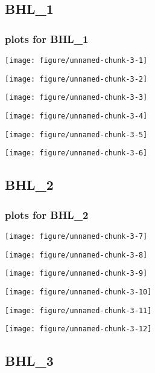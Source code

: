 \documentclass[10pt,a4paper]{article}\usepackage[]{graphicx}\usepackage[]{color}
\makeatletter
\def\maxwidth{ %
  \ifdim\Gin@nat@width>\linewidth
    \linewidth
  \else
    \Gin@nat@width
  \fi
}
\newcommand{\AaA}{\_}
\makeatother
\begin{document}
\subsection{BHL\AaA 1}
\subsubsection{plots for BHL\AaA 1}

\texttt{[image: figure/unnamed-chunk-3-1]} 

\newpage

\texttt{[image: figure/unnamed-chunk-3-2]} 

\newpage

\texttt{[image: figure/unnamed-chunk-3-3]} 

\newpage

\texttt{[image: figure/unnamed-chunk-3-4]} 

\newpage

\texttt{[image: figure/unnamed-chunk-3-5]} 

\newpage

\texttt{[image: figure/unnamed-chunk-3-6]} 

\newpage
\subsection{BHL\AaA 2}
\subsubsection{plots for BHL\AaA 2}

\texttt{[image: figure/unnamed-chunk-3-7]} 

\newpage

\texttt{[image: figure/unnamed-chunk-3-8]} 

\newpage

\texttt{[image: figure/unnamed-chunk-3-9]} 

\newpage

\texttt{[image: figure/unnamed-chunk-3-10]} 

\newpage

\texttt{[image: figure/unnamed-chunk-3-11]} 

\newpage

\texttt{[image: figure/unnamed-chunk-3-12]} 

\newpage
\subsection{BHL\AaA 3}
\end{document}
